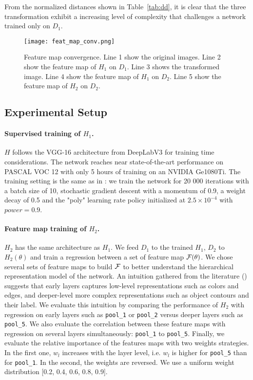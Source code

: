 \documentclass{bmvc2k}
\begin{document}
From the normalized distances shown in Table~\ref{tab:dd}, it is clear that
the three transformation exhibit a increasing level of complexity that
challenges a network trained only on $D_1$. 

\begin{figure}[thb]
  \centering
  \texttt{[image: feat\_map\_conv.png]}
   \caption{Feature map convergence. 
   Line 1 show the original images. 
   Line 2 show the feature map of $H_1$ on $D_1$. 
   Line 3 shows the transformed image. 
   Line 4 show the feature map of $H_1$ on $D_2$. 
   Line 5 show the feature map of $H_2$ on $D_2$.}
  \label{fig:feat_map}
\end{figure}
\subsection{Experimental Setup}

\paragraph{Supervised training of $H_1$.}
$H$ follows the VGG-16 architecture \cite{simonyan2014very} from DeepLabV3 \cite{chen2018deeplab} for
training time considerations. The network reaches near state-of-the-art
performance on PASCAL VOC 12 with only 5 hours of training on an NVIDIA Ge1080Ti.
The training setting is the same as in \cite{chen2018deeplab}:
we train the network for 20 000 iterations with a batch size of 10, stochastic
gradient descent with a momentum of 0.9, a weight decay of 0.5 and the "poly"
learning rate policy initialized at $2.5 \times 10^{-4}$ with
$power=0.9$. 

\paragraph{Feature map training of $H_2$.}
$H_2$ has the same architecture as $H_1$. We feed $D_1$ to the trained $H_1$,
$D_2$ to $H_2(\theta)$ and train a regression between a set of feature map ${\cal F}(\theta)$. 
We chose several sets of feature maps to build ${\cal F}$ to better understand the hierarchical representation
model of the network. An intuition gathered from the literature 
(\cite{dosovitskiy2016inverting,oquab2014learning,simonyan2013deep}) suggests that early layers captures low-level 
representations such as colors and edges, and deeper-level more complex representations 
such as object contours and their label. 
We evaluate this intuition by comparing the performance of $H_2$ with regression 
on early layers such as {\tt pool\_1} or {\tt pool\_2} versus deeper layers 
such as {\tt pool\_5}. 
We also evaluate the correlation between these feature maps with regression 
on several layers simultaneously: {\tt pool\_1} to {\tt pool\_5}. 
Finally, we evaluate the relative importance of the features maps with two weights 
strategies. In the first one, $w_l$ increases with the layer level, i.e. $w_l$ is 
higher for {\tt pool\_5} than for {\tt pool\_1}. In the second, the weights are reversed. We use a uniform weight distribution [0.2, 0.4, 0.6, 0.8, 0.9]. 
\end{document}
